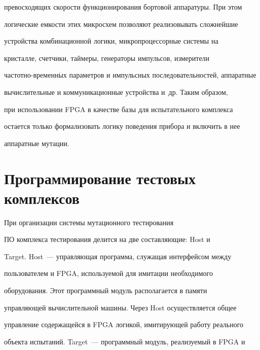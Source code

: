 превосходящих скорости функционирования бортовой аппаратуры. При этом


логические емкости этих микросхем позволяют реализовывать сложнейшие


устройства комбинационной логики, микропроцессорные системы на


кристалле, счетчики, таймеры, генераторы импульсов, измерители


час\-тот\-но-вре\-мен\-н$\acute{\mbox{ы}}$х параметров и импульсных последовательностей, аппаратные


вычислительные и коммуникационные устройства и~др. Таким образом,


при использовании FPGA в качестве базы для испытательного комплекса


остается только формализовать логику поведения прибора и включить в нее


аппаратные мутации.





\vspace*{-9pt}





    \section{Программирование тестовых комплексов}





    \vspace*{-3pt}





    При организации системы мутационного тестирования


ПО комплекса тестирования делится на две составляющие: Host и


Target. Host~--- управляющая программа, служащая интерфейсом между


пользователем и FPGA, используемой для имитации необходимого


оборудования. Этот программный модуль располагается в памяти


управляющей вычислительной машины. Через Host осуществляется общее


управление содержащейся в FPGA логикой, имитирующей работу реального


объекта испытаний. Target~--- программный модуль, реализуемый в FPGA и


